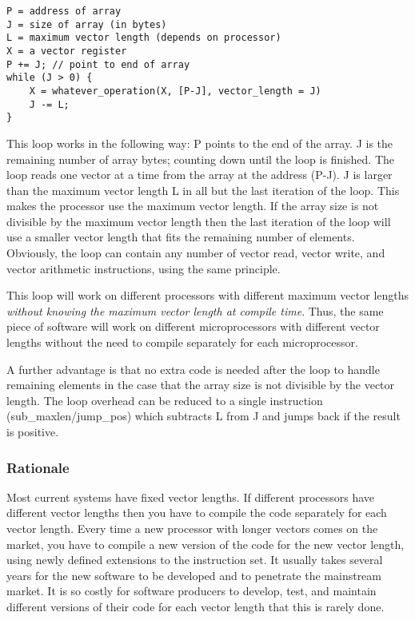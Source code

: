 \documentclass[forwardcom.tex]{subfiles}
\begin{document}
\begin{lstlisting}[frame=single]
P = address of array
J = size of array (in bytes)
L = maximum vector length (depends on processor)
X = a vector register
P += J; // point to end of array
while (J > 0) {
    X = whatever_operation(X, [P-J], vector_length = J)
    J -= L;
}
\end{lstlisting}
\vspace{2mm}

This loop works in the following way: P points to the end of the array. J is the remaining number of array bytes; counting down until the loop is finished. The loop reads one vector at a time from the array at the address (P-J). J is larger than the maximum vector length L in all but the last iteration of the loop. This makes the processor use the maximum vector length. If the array size is not divisible by the maximum vector length then the last iteration of the loop will use a smaller vector length that fits the remaining number of elements. Obviously, the loop can contain any number of vector read, vector write, and vector arithmetic instructions, using the same principle. 
\vspace{2mm}

This loop will work on different processors with different maximum vector lengths \textit{without knowing the maximum vector length at compile time}. Thus, the same piece of software will work on different microprocessors with different vector lengths without the need to compile separately for each microprocessor. 
\vspace{2mm}

A further advantage is that no extra code is needed after the loop to handle remaining elements in the case that the array size is not divisible by the vector length.
The loop overhead can be reduced to a single instruction (sub\_maxlen/jump\_pos) which subtracts L from 
J and jumps back if the result is positive.

\subsubsection{Rationale}
Most current systems have fixed vector lengths. If different processors have different vector lengths then you have to compile the code separately for each vector length. Every time a new processor with longer vectors comes on the market, you have to compile a new version of the code for the new vector length, using newly defined extensions to the instruction set. It usually takes several years for the new software to be developed and to penetrate the mainstream market. It is so costly for software producers to develop, test, and maintain different versions of their code for each vector length that this is rarely done.
\vspace{2mm}
\end{document}
